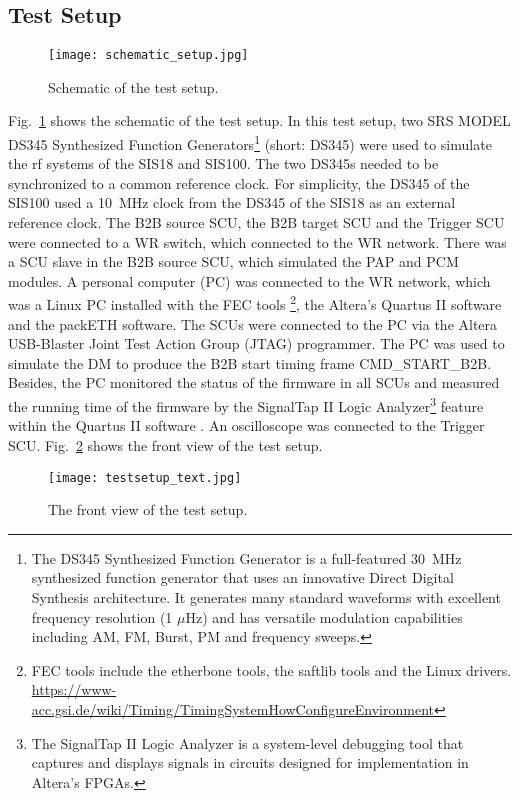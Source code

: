 \subsection{Test Setup}
\label{sec:test_timing}
\begin{figure}[H]
   \centering   
   \texttt{[image: schematic\_setup.jpg]}
   \caption{Schematic of the test setup.}
   \label{setup}
\end{figure}
Fig.~\ref{setup} shows the schematic of the test setup. In this test setup, two SRS MODEL DS345 Synthesized Function Generators\footnote{The DS345 Synthesized Function Generator is a full-featured \SI{30}{\MHz} synthesized function generator that uses an innovative Direct Digital Synthesis architecture. It generates many standard waveforms with excellent frequency resolution (1 $\mu$Hz) and has versatile modulation capabilities including AM, FM, Burst, PM and frequency sweeps.} (short: DS345) were used to simulate the rf systems of the SIS18 and SIS100. The two DS345s needed to be synchronized to a common reference clock. For simplicity, the DS345 of the SIS100 used a \SI{10}{\MHz} clock from the DS345 of the SIS18 as an external reference clock. The B2B source SCU, the B2B target SCU and the Trigger SCU were connected to a WR switch, which connected to the WR network. There was a SCU slave in the B2B source SCU, which simulated the PAP and PCM modules. A personal computer (\gls{PC}) was connected to the WR network, which was a Linux PC installed with the FEC tools \footnote{FEC tools include the etherbone tools, the saftlib tools and the Linux drivers. \\ \url{https://www-acc.gsi.de/wiki/Timing/TimingSystemHowConfigureEnvironment}}, the Altera's Quartus II software and the packETH software. The SCUs were connected to the PC via the Altera USB-Blaster Joint Test Action Group (JTAG) programmer. The PC was used to simulate the DM to produce the B2B start timing frame CMD\_START\_B2B. Besides, the PC monitored the status of the firmware in all SCUs and measured the running time of the firmware by the SignalTap II Logic Analyzer\footnote{The SignalTap II Logic Analyzer is a system-level debugging tool that captures and displays signals in circuits designed for implementation in Altera’s FPGAs.} feature within the Quartus II software . An oscilloscope was connected to the Trigger SCU. Fig.~\ref{testsetup_text} shows the front view of the test setup. 
\begin{figure}[!htb]
   \centering   
   \texttt{[image: testsetup\_text.jpg]}
   \caption{The front view of the test setup.}
   \label{testsetup_text}
\end{figure}

